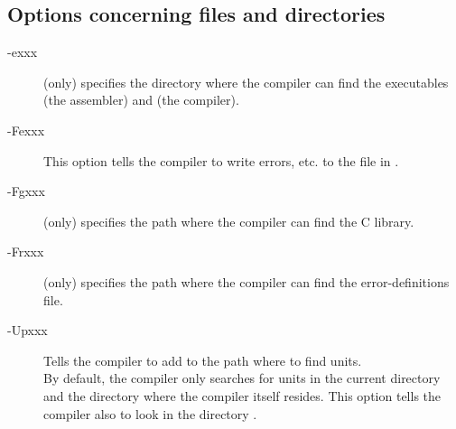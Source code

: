 \documentclass{report}
\newcommand{\olabel}[1]{\label{option:#1}}
\begin{document}
%
%

\subsection{Options concerning files and directories}
\begin{description}
\item [-exxx] (\linux only)  specifies the directory where the 
compiler can find the executables  (the assembler) and  (the
compiler).
\olabel{e}
\item [-Fexxx] This option tells the compiler to write errors, etc. to 
the file in .
\olabel{Fe} 
\item [-Fgxxx] (\linux only)  specifies the path where the compiler
can find the \gnu C library.
\olabel{Fg}
\item [-Frxxx] (\linux only)  specifies the path where the
compiler can find the error-definitions file.
\olabel{Fr}
\item [-Upxxx] \olabel{Up} Tells the compiler to add  to the path where to find
units. \\
By default, the compiler only searches for units in the current directory 
and the directory where the compiler itself resides. This option tells the
compiler also to look in the directory .
\end{description}

\end{document}
